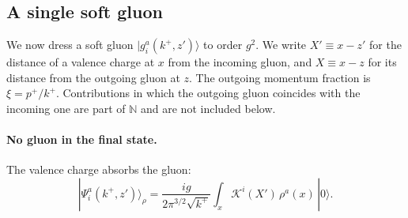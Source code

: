 \documentclass[aps,prd,onecolumn,superscriptaddress,nofootinbib,floatfix,longbibliography,11pt]{revtex4-2}
\numberwithin{equation}{section}
\newcommand{\KK}{\mathcal{K}}
\def\mf#1{\mathbb{#1}}
\begin{document}
\subsection{A single soft gluon}\label{sec:singleglue}

We now dress a soft gluon $|g^a_i(k^+,z')\rangle$ to order $g^2$. We write $X'\equiv x-z'$ for the distance of a valence charge at $x$ from the incoming gluon, and $X\equiv x-z$ for its distance from the outgoing gluon at $z$. The outgoing momentum fraction is $\xi=p^+/k^+$. Contributions in which the outgoing gluon coincides with the incoming one are part of $\mf N$ and are not included below.

\paragraph*{No gluon in the final state.} The valence charge absorbs the gluon:
\begin{equation}
|\Psi^a_i(k^+,z')\rangle_\rho=\frac{ig}{2\pi^{3/2}\sqrt{k^+}}\int_x\KK^i(X')\,\rho^a(x)\,|0\rangle .
\label{eq:absorb}
\end{equation}
\end{document}
